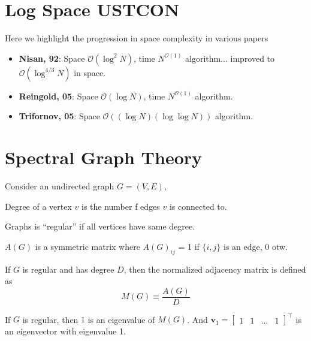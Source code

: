 \documentclass[11pt, letter]{book}
\newcommand{\bv}{\mathbf{v}}
\begin{document}
\section{Log Space USTCON}
Here we highlight the progression in space complexity in various papers
\begin{itemize}
	\item \textbf{Nisan, 92}: Space $\mathcal O (\log ^ 2 N)$, time $N ^{\mathcal O (1)}$ algorithm... improved to $\mathcal O (\log ^ {4/3} N)$ in space. 
	\item \textbf{Reingold, 05}: Space $\mathcal O (\log N)$, time $N ^{\mathcal O (1)}$ algorithm. 
	\item \textbf{Trifornov, 05}: Space $\mathcal O ((\log N )(\log\log N))$ algorithm. 
\end{itemize}


\section{Spectral Graph Theory}
Consider an undirected graph $G = (V, E)$, 
\begin{definition}[Degree]
	Degree of a vertex $v$ is the number f edges $v$ is connected to.
\end{definition}

\begin{definition}[Regular]
	Graphs is ``regular'' if all vertices have same degree. 
\end{definition}

\begin{definition}
	$A(G)$ is a symmetric matrix where $A(G)_{ij}$ = 1 if $\{i, j\}$ is an edge, 0 otw. 
\end{definition}

\begin{definition}
	If $G$ is regular and has degree $D$, then the normalized adjacency matrix is defined as 
	\begin{equation}
		M(G) \equiv \frac{A(G)}{D}
	\end{equation}
\end{definition}

\begin{lemma}
	If $G$ is regular, then $1$ is an eigenvalue of $M(G)$. And $\bv_1 = \begin{bmatrix}
		1 & 1 & \dots & 1
	\end{bmatrix}^\top$ is an eigenvector with eigenvalue 1. 
\end{lemma}
\end{document}
